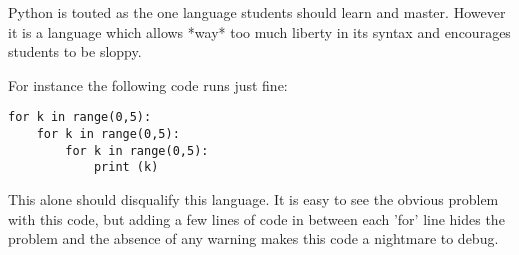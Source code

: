
Python is touted as the one language students should learn and master. However it is a language which allows *way* too much liberty in its syntax and encourages students to be sloppy. 

For instance the following code runs just fine:

\begin{lstlisting}
for k in range(0,5): 
    for k in range(0,5):
        for k in range(0,5):
            print (k)
\end{lstlisting}

This alone should disqualify this language. It is easy to see the obvious problem with this code, but adding a few lines of code in between each 'for' line hides the problem and the absence of any warning makes this code a nightmare to debug.


